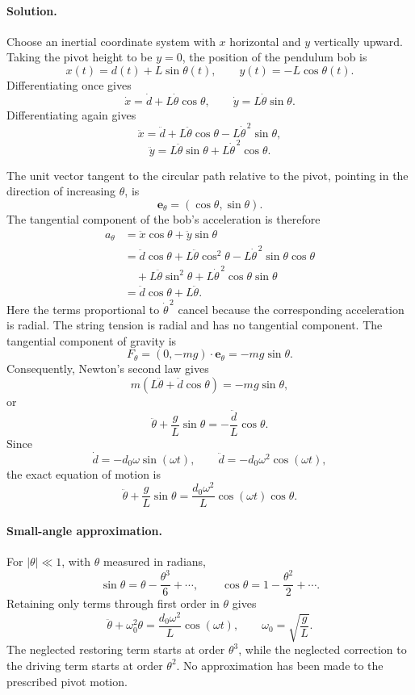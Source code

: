 \documentclass[12pt]{article}
\begin{document}
\paragraph{Solution.}
Choose an inertial coordinate system with $x$ horizontal and $y$
vertically upward. Taking the pivot height to be $y=0$, the position
of the pendulum bob is
\[
x(t)=d(t)+L\sin\theta(t),
\qquad
y(t)=-L\cos\theta(t).
\]
Differentiating once gives
\[
\dot{x}=\dot{d}+L\dot{\theta}\cos\theta,
\qquad
\dot{y}=L\dot{\theta}\sin\theta.
\]
Differentiating again gives
\[
\ddot{x}
=\ddot{d}
+L\ddot{\theta}\cos\theta
-L\dot{\theta}^{\,2}\sin\theta,
\]
\[
\ddot{y}
=L\ddot{\theta}\sin\theta
+L\dot{\theta}^{\,2}\cos\theta.
\]

The unit vector tangent to the circular path relative to the pivot,
pointing in the direction of increasing $\theta$, is
\[
\mathbf{e}_{\theta}=(\cos\theta,\sin\theta).
\]
The tangential component of the bob's acceleration is therefore
\begin{align*}
a_{\theta}
&=\ddot{x}\cos\theta+\ddot{y}\sin\theta\\
&=\ddot{d}\cos\theta
+L\ddot{\theta}\cos^2\theta
-L\dot{\theta}^{\,2}\sin\theta\cos\theta\\
&\quad
+L\ddot{\theta}\sin^2\theta
+L\dot{\theta}^{\,2}\cos\theta\sin\theta\\
&=\ddot{d}\cos\theta+L\ddot{\theta}.
\end{align*}
Here the terms proportional to $\dot{\theta}^{\,2}$ cancel because the corresponding acceleration is radial. The string tension is radial and has no tangential component. The tangential component of gravity is
\[
F_{\theta}=(0,-mg)\cdot\mathbf{e}_{\theta}
=-mg\sin\theta.
\]
Consequently, Newton's second law gives
\[
m\left(L\ddot{\theta}+\ddot{d}\cos\theta\right)
=-mg\sin\theta,
\]
or
\[
\ddot{\theta}+\frac{g}{L}\sin\theta
=-\frac{\ddot{d}}{L}\cos\theta.
\]
Since
\[
\dot{d}=-d_0\omega\sin(\omega t),
\qquad
\ddot{d}=-d_0\omega^2\cos(\omega t),
\]
the exact equation of motion is
\[
\boxed{
\ddot{\theta}+\frac{g}{L}\sin\theta
=\frac{d_0\omega^2}{L}\cos(\omega t)\cos\theta.
}
\]

\paragraph{Small-angle approximation.}
For $|\theta|\ll 1$, with $\theta$ measured in radians,
\[
\sin\theta=\theta-\frac{\theta^3}{6}+\cdots,
\qquad
\cos\theta=1-\frac{\theta^2}{2}+\cdots.
\]
Retaining only terms through first order in $\theta$ gives
\[
\boxed{
\ddot{\theta}+\omega_0^2\theta
=\frac{d_0\omega^2}{L}\cos(\omega t),
\qquad
\omega_0=\sqrt{\frac{g}{L}}.
}
\]
The neglected restoring term starts at order $\theta^3$, while the
neglected correction to the driving term starts at order $\theta^2$.
No approximation has been made to the prescribed pivot motion.
\end{document}
